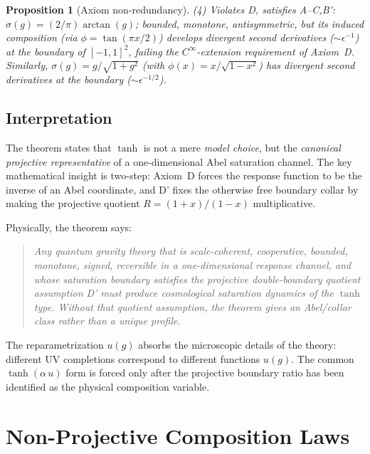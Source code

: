 \documentclass[aps,prd,twocolumn,superscriptaddress,nofootinbib]{revtex4-2}
\newtheorem{proposition}{Proposition}
\begin{document}
\begin{proposition}[Axiom non-redundancy]
\textit{(4) Violates D, satisfies A--C,B':} $\sigma(g) = (2/\pi)\arctan(g)$; bounded, monotone, antisymmetric, but its induced composition (via $\phi = \tan(\pi x/2)$) develops divergent second derivatives ($\sim \epsilon^{-1}$) at the boundary of $[-1,1]^2$, failing the $C^\infty$-extension requirement of Axiom~D. Similarly, $\sigma(g) = g/\sqrt{1+g^2}$ (with $\phi(x) = x/\sqrt{1-x^2}$) has divergent second derivatives at the boundary ($\sim \epsilon^{-1/2}$).
\end{proposition}

\subsection{Interpretation}

The theorem states that $\tanh$ is not a mere \textit{model choice}, but the \textit{canonical projective representative} of a one-dimensional Abel saturation channel. The key mathematical insight is two-step: Axiom~D forces the response function to be the inverse of an Abel coordinate, and D' fixes the otherwise free boundary collar by making the projective quotient $R=(1+x)/(1-x)$ multiplicative.

Physically, the theorem says:
\begin{quote}
\textit{Any quantum gravity theory that is scale-coherent, cooperative, bounded, monotone, signed, reversible in a one-dimensional response channel, and whose saturation boundary satisfies the projective double-boundary quotient assumption D' must produce cosmological saturation dynamics of the $\tanh$ type. Without that quotient assumption, the theorem gives an Abel/collar class rather than a unique profile.}
\end{quote}

The reparametrization $u(g)$ absorbs the microscopic details of the theory: different UV completions correspond to different functions $u(g)$. The common $\tanh(\alpha\,u)$ form is forced only after the projective boundary ratio has been identified as the physical composition variable.


\section{Non-Projective Composition Laws}
\label{sec:exclusion}
\end{document}
